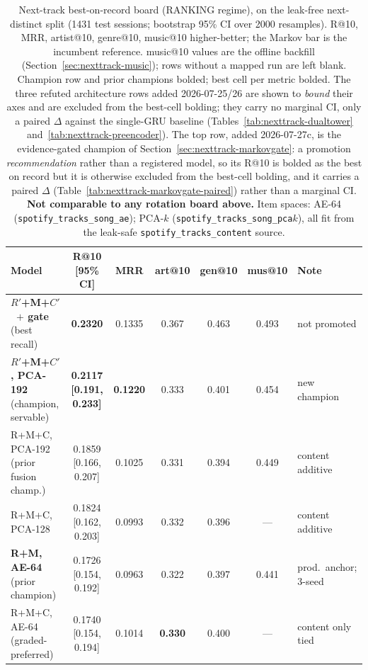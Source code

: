 \documentclass[11pt]{article}
\newcommand{\dsid}[1]{\texttt{\small #1}}
\newcommand{\best}[1]{\textbf{#1}}
\newcommand{\Rp}{\ensuremath{R'}}
\newcommand{\Cp}{\ensuremath{C'}}
\begin{document}
\begin{table}[ht]
  \centering
  \caption{Next-track best-on-record board (RANKING regime), on the leak-free
  next-distinct split (\num{1431} test sessions; bootstrap 95\% CI over
  \num{2000} resamples). R@10, MRR, artist@10, genre@10, music@10 higher-better;
  the Markov bar is the incumbent reference. music@10 values are the offline
  backfill (Section~\ref{sec:nexttrack-music}); rows without a mapped run are
  left blank. Champion row and prior champions bolded; best cell per metric
  bolded. The three refuted architecture rows added 2026-07-25/26 are shown to
  \emph{bound} their axes and are excluded from the best-cell bolding; they carry
  no marginal CI, only a paired $\Delta$ against the single-GRU baseline
  (Tables~\ref{tab:nexttrack-dualtower} and~\ref{tab:nexttrack-preencoder}).
  The top row, added 2026-07-27c, is the evidence-gated champion of
  Section~\ref{sec:nexttrack-markovgate}: a promotion \emph{recommendation} rather
  than a registered model, so its R@10 is bolded as the best on record but it is
  otherwise excluded from the best-cell bolding, and it carries a paired $\Delta$
  (Table~\ref{tab:nexttrack-markovgate-paired}) rather than a marginal CI.
  \textbf{Not comparable to any rotation board above.} Item spaces: AE-64 (\dsid{spotify\_tracks\_song\_ae}); PCA-$k$
  (\dsid{spotify\_tracks\_song\_pca$k$}), all fit from the leak-safe
  \dsid{spotify\_tracks\_content} source.}
  \label{tab:nexttrack-lb}
  {\footnotesize\setlength{\tabcolsep}{4pt}\begin{tabular}{lcccccl}
    \toprule
    Model & R@10 [95\% CI] & MRR & art@10 & gen@10 & mus@10 & Note \\
    \midrule
    \best{\Rp+M+\Cp\ $+$ gate} (best recall) & \best{0.2320} & 0.1335 & 0.367 & 0.463 & 0.493 & not promoted \\
    \best{\Rp+M+\Cp, PCA-192} (champion, servable) & \best{0.2117 [0.191, 0.233]} & \best{0.1220} & 0.333 & 0.401 & 0.454 & new champion \\
    R+M+C, PCA-192 (prior fusion champ.)  & 0.1859 [0.166, 0.207] & 0.1025 & 0.331 & 0.394 & 0.449 & content additive \\
    R+M+C, PCA-128                        & 0.1824 [0.162, 0.203] & 0.0993 & 0.332 & 0.396 & --- & content additive \\
    \best{R+M, AE-64} (prior champion)    & 0.1726 [0.154, 0.192] & 0.0963 & 0.322 & 0.397 & 0.441 & prod.\ anchor; 3-seed \\
    R+M+C, AE-64 (graded-preferred)       & 0.1740 [0.154, 0.194] & 0.1014 & \best{0.330} & 0.400 & --- & content only tied \\

\end{tabular}}
\end{table}
\end{document}
